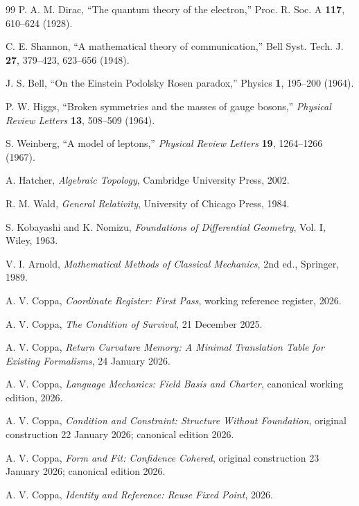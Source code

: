 \documentclass[11pt]{article}
\begin{document}
\begin{thebibliography}{99}
P. A. M. Dirac, ``The quantum theory of the electron,'' Proc. R. Soc. A \textbf{117}, 610--624 (1928).

C. E. Shannon, ``A mathematical theory of communication,'' Bell Syst. Tech. J. \textbf{27}, 379--423, 623--656 (1948).

J. S. Bell, ``On the Einstein Podolsky Rosen paradox,'' Physics \textbf{1}, 195--200 (1964).

P. W. Higgs, ``Broken symmetries and the masses of gauge bosons,'' \emph{Physical Review Letters} \textbf{13}, 508--509 (1964).

S. Weinberg, ``A model of leptons,'' \emph{Physical Review Letters} \textbf{19}, 1264--1266 (1967).

A. Hatcher, \emph{Algebraic Topology}, Cambridge University Press, 2002.

R. M. Wald, \emph{General Relativity}, University of Chicago Press, 1984.

S. Kobayashi and K. Nomizu, \emph{Foundations of Differential Geometry}, Vol. I, Wiley, 1963.

V. I. Arnold, \emph{Mathematical Methods of Classical Mechanics}, 2nd ed., Springer, 1989.

A. V. Coppa, \emph{Coordinate Register: First Pass}, working reference register, 2026.

A. V. Coppa, \emph{The Condition of Survival}, 21 December 2025.

A. V. Coppa, \emph{Return Curvature Memory: A Minimal Translation Table for Existing Formalisms}, 24 January 2026.

A. V. Coppa, \emph{Language Mechanics: Field Basis and Charter}, canonical working edition, 2026.

A. V. Coppa, \emph{Condition and Constraint: Structure Without Foundation}, original construction 22 January 2026; canonical edition 2026.

A. V. Coppa, \emph{Form and Fit: Confidence Cohered}, original construction 23 January 2026; canonical edition 2026.

A. V. Coppa, \emph{Identity and Reference: Reuse Fixed Point}, 2026.


\end{thebibliography}
\end{document}
